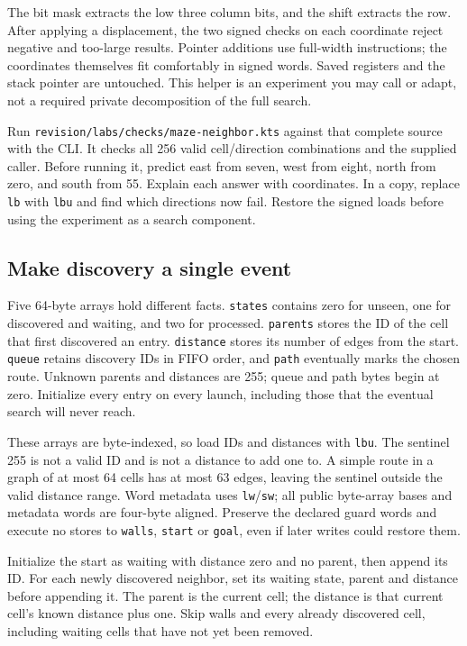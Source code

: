The bit mask extracts the low three column bits, and the shift extracts the row.
After applying a displacement, the two signed checks on each coordinate reject
negative and too-large results. Pointer additions use full-width instructions;
the coordinates themselves fit comfortably in signed words. Saved registers and
the stack pointer are untouched. This helper is an experiment you may call or
adapt, not a required private decomposition of the full search.

Run \texttt{revision/labs/checks/maze-neighbor.kts} against that complete source
with the CLI. It checks all 256 valid cell/direction combinations and the supplied
caller. Before running it, predict east from seven, west from eight, north from
zero, and south from 55. Explain each answer with coordinates. In a copy, replace
\texttt{lb} with \texttt{lbu} and find which directions now fail. Restore the
signed loads before using the experiment as a search component.

\subsection*{Make discovery a single event}

Five 64-byte arrays hold different facts. \texttt{states} contains zero for unseen,
one for discovered and waiting, and two for processed. \texttt{parents} stores the
ID of the cell that first discovered an entry. \texttt{distance} stores its number
of edges from the start. \texttt{queue} retains discovery IDs in FIFO order, and
\texttt{path} eventually marks the chosen route. Unknown parents and distances
are 255; queue and path bytes begin at zero. Initialize every entry on every launch,
including those that the eventual search will never reach.

These arrays are byte-indexed, so load IDs and distances with \texttt{lbu}.
The sentinel 255 is not a valid ID and is not a distance to add one to. A simple
route in a graph of at most 64 cells has at most 63 edges, leaving the sentinel
outside the valid distance range. Word metadata uses \texttt{lw}/\texttt{sw};
all public byte-array bases and metadata words are four-byte aligned. Preserve
the declared guard words and execute no stores to \texttt{walls}, \texttt{start}
or \texttt{goal}, even if later writes could restore them.

Initialize the start as waiting with distance zero and no parent, then append
its ID. For each newly discovered neighbor, set its waiting state, parent and
distance before appending it. The parent is the current cell; the distance is
that current cell's known distance plus one. Skip walls and every already
discovered cell, including waiting cells that have not yet been removed.

